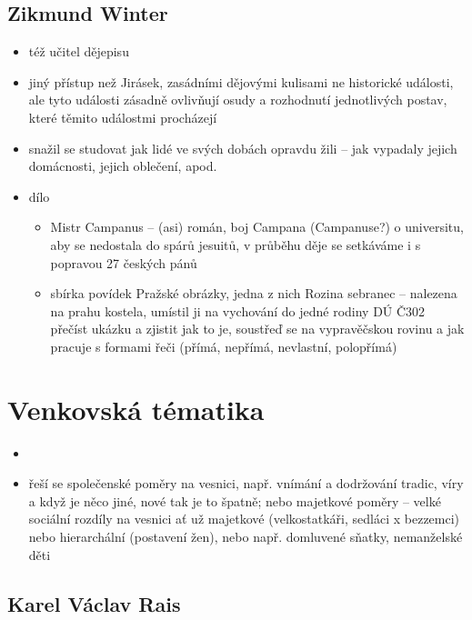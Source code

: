 \documentclass{article}
\begin{document}
\subsection{Zikmund Winter}
\begin{itemize}
  \item též učitel dějepisu
  \item jiný přístup než Jirásek, zasádními dějovými kulisami ne historické události, ale tyto události zásadně ovlivňují osudy a rozhodnutí jednotlivých postav, které těmito událostmi procházejí
  \item snažil se studovat jak lidé ve svých dobách opravdu žili -- jak vypadaly jejich domácnosti, jejich oblečení, apod.
  \item dílo
  \begin{itemize}
    \item Mistr Campanus -- (asi) román, boj Campana (Campanuse?) o universitu, aby se nedostala do spárů jesuitů, v průběhu děje se setkáváme i s popravou 27 českých pánů
    \item sbírka povídek Pražské obrázky, jedna z nich Rozina sebranec -- nalezena na prahu kostela, umístil ji na vychování do jedné rodiny DÚ Č302 přečíst ukázku a zjistit jak to je, soustřeď se na vypravěčskou rovinu a jak pracuje s formami řeči (přímá, nepřímá, nevlastní, polopřímá)
  \end{itemize}
\end{itemize}

\section{Venkovská tématika}
\begin{itemize}
  \item {}
  \item řeší se společenské poměry na vesnici, např. vnímání a dodržování tradic, víry a když je něco jiné, nové tak je to špatně; nebo majetkové poměry -- velké sociální rozdíly na vesnici ať už majetkové (velkostatkáři, sedláci x bezzemci) nebo hierarchální (postavení žen), nebo např. domluvené sňatky, nemanželské děti
\end{itemize}

\subsection{Karel Václav Rais}
\end{document}

